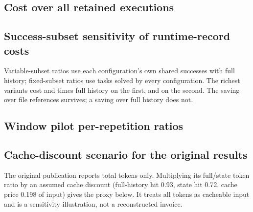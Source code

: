 \subsection{Cost over all retained executions}
\label{app:efficiency}
\begin{table}[htbp]
\centering\small
\caption{Cost and efficiency including failures. Median and mean cost
answer different questions from aggregate cost per success; none estimates
retry-until-success cost.}
\label{tab:economics}
\resizebox{\linewidth}{!}{}
\end{table}

\subsection{Success-subset sensitivity of runtime-record costs}
\label{app:composition}
Variable-subset ratios use each configuration's own shared successes with
full history; fixed-subset ratios use tasks solved by every configuration.
The richest variants cost \ExploreRichVariableCostRatio{} and
\ExploreFailuresVariableCostRatio{} times full history on the first,
\ExploreRichFixedCostRatio{} and \ExploreFailuresFixedCostRatio{} on the
second. The saving over file references survives; a saving over full
history does not.
\begin{table}[htbp]
\centering\small
\caption{Runtime-record cost sensitivity. Entries are medians of task-wise
ratios to full history.}
\label{tab:composition-sensitivity}

\end{table}

\subsection{Window pilot per-repetition ratios}
\label{app:window}
\begin{table}[htbp]
\centering\small
\caption{Window pilot: median same-repetition ratios to full history for
cost and peak prompt, reported separately for each repetition.}
\label{tab:window-repeats}
\resizebox{\linewidth}{!}{}
\end{table}

\subsection{Cache-discount scenario for the original results}
\label{app:pricing}
The original publication reports total tokens only. Multiplying its
full/state token ratio by an assumed cache discount (full-history hit 0.93,
state hit 0.72, cache price 0.198 of input) gives the proxy below. It
treats all tokens as cacheable input and is a sensitivity illustration,
not a reconstructed invoice.
\begin{table}[htbp]
\centering\small
\caption{Published full/state token ratio and discounted-token proxy by
event horizon. Values above one favor state under the proxy.}
\label{tab:pricing}

\end{table}
